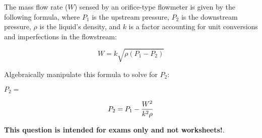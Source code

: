 

The mass flow rate ($W$) sensed by an orifice-type flowmeter is given by the following formula, where $P_1$ is the upstream pressure, $P_2$ is the downstream pressure, $\rho$ is the liquid's density, and $k$ is a factor accounting for unit conversions and imperfections in the flowstream:
 
$$W = k \sqrt{\rho (P_1 - P_2)}$$

Algebraically manipulate this formula to solve for $P_2$:

\vskip 20pt

$P_2 = $







$$P_2 = P_1 - {W^2 \over k^2 \rho}$$







{\bf This question is intended for exams only and not worksheets!}.



